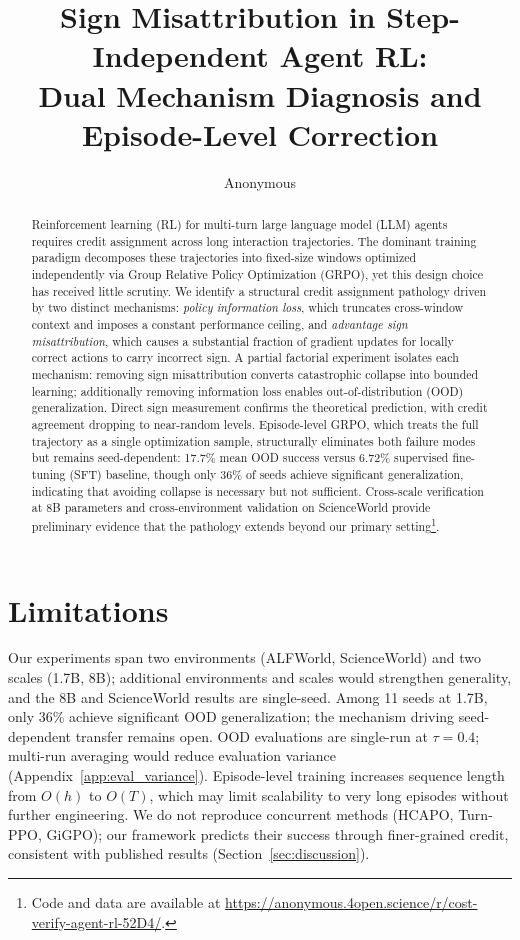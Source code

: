 \documentclass[11pt]{article}
\title{Sign Misattribution in Step-Independent Agent RL:\\Dual Mechanism Diagnosis and Episode-Level Correction}
\author{Anonymous}
\begin{document}
\maketitle

\begin{abstract}
Reinforcement learning (RL) for multi-turn large language model (LLM) agents requires credit assignment across long interaction trajectories. The dominant training paradigm decomposes these trajectories into fixed-size windows optimized independently via Group Relative Policy Optimization (GRPO), yet this design choice has received little scrutiny. We identify a structural credit assignment pathology driven by two distinct mechanisms: \textit{policy information loss}, which truncates cross-window context and imposes a constant performance ceiling, and \textit{advantage sign misattribution}, which causes a substantial fraction of gradient updates for locally correct actions to carry incorrect sign. A partial factorial experiment isolates each mechanism: removing sign misattribution converts catastrophic collapse into bounded learning; additionally removing information loss enables out-of-distribution (OOD) generalization. Direct sign measurement confirms the theoretical prediction, with credit agreement dropping to near-random levels. Episode-level GRPO, which treats the full trajectory as a single optimization sample, structurally eliminates both failure modes but remains seed-dependent: 17.7\% mean OOD success versus 6.72\% supervised fine-tuning (SFT) baseline, though only 36\% of seeds achieve significant generalization, indicating that avoiding collapse is necessary but not sufficient. Cross-scale verification at 8B parameters and cross-environment validation on ScienceWorld provide preliminary evidence that the pathology extends beyond our primary setting\footnote{Code and data are available at \url{https://anonymous.4open.science/r/cost-verify-agent-rl-52D4/}.}.
\end{abstract}









\section*{Limitations}

Our experiments span two environments (ALFWorld, ScienceWorld) and two scales (1.7B, 8B); additional environments and scales would strengthen generality, and the 8B and ScienceWorld results are single-seed. Among 11 seeds at 1.7B, only 36\% achieve significant OOD generalization; the mechanism driving seed-dependent transfer remains open. OOD evaluations are single-run at $\tau{=}0.4$; multi-run averaging would reduce evaluation variance (Appendix~\ref{app:eval_variance}). Episode-level training increases sequence length from $O(h)$ to $O(T)$, which may limit scalability to very long episodes without further engineering. We do not reproduce concurrent methods (HCAPO, Turn-PPO, GiGPO); our framework predicts their success through finer-grained credit, consistent with published results (Section~\ref{sec:discussion}).



\clearpage

\end{document}
